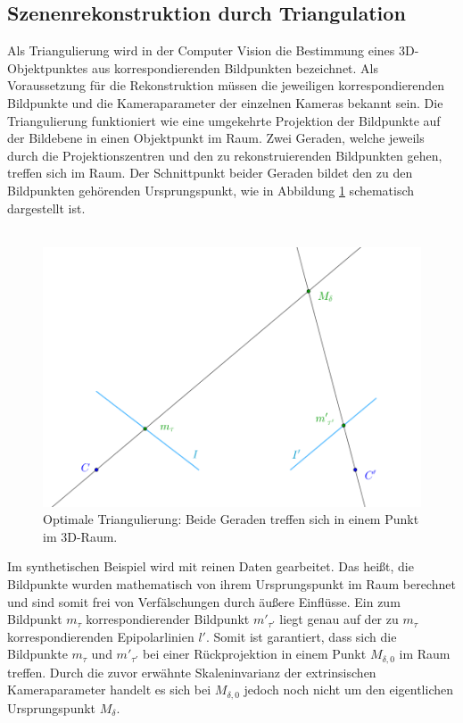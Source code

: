 \subsection{Szenenrekonstruktion durch Triangulation}

Als Triangulierung wird in der Computer Vision die Bestimmung eines 3D-Objektpunktes aus korrespondierenden Bildpunkten bezeichnet. Als Voraussetzung für die Rekonstruktion müssen die jeweiligen korrespondierenden Bildpunkte und die Kameraparameter der einzelnen Kameras bekannt sein. Die Triangulierung funktioniert wie eine umgekehrte Projektion der Bildpunkte auf der Bildebene in einen Objektpunkt im Raum. Zwei Geraden, welche jeweils durch die Projektionszentren und den zu rekonstruierenden Bildpunkten gehen,  treffen sich im Raum. Der Schnittpunkt beider Geraden bildet den zu den Bildpunkten gehörenden Ursprungspunkt, wie in Abbildung \ref{fig:TriangulationOptimal} schematisch dargestellt ist.  \\\\




\begin{figure}[!htb]
	\centering
	\includegraphics[width=0.7\linewidth]{images/optimaleTriangulierung.png}
	\caption[Geometrische Triangulation]{Optimale Triangulierung: Beide Geraden treffen sich in einem Punkt im 3D-Raum.} 
	\label{fig:TriangulationOptimal}
\end{figure}


Im synthetischen Beispiel wird mit reinen Daten gearbeitet. Das heißt, die Bildpunkte wurden mathematisch von ihrem Ursprungspunkt im Raum berechnet und sind somit frei von Verfälschungen durch äußere Einflüsse. Ein zum Bildpunkt $m_\tau$ korrespondierender Bildpunkt $m'_{\tau'}$ liegt genau auf der zu $m_\tau$ korrespondierenden Epipolarlinien $l'$. Somit ist garantiert, dass sich die Bildpunkte $m_\tau$ und $m'_{\tau'}$ bei einer Rückprojektion in einem Punkt $M_{\delta,0}$ im Raum treffen. Durch die zuvor erwähnte Skaleninvarianz der extrinsischen Kameraparameter handelt es sich bei $M_{\delta,0}$ jedoch noch nicht um den eigentlichen Ursprungspunkt $M_\delta$. \\

